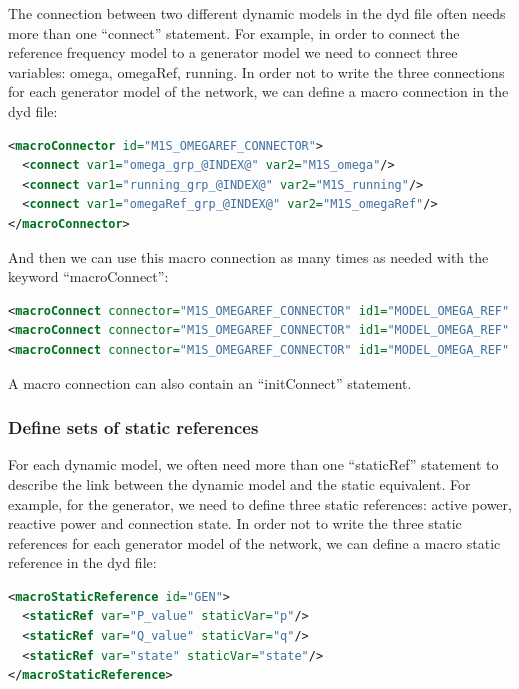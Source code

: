 \documentclass[a4paper, 12pt]{report}
\begin{document}
The connection between two different dynamic models in the dyd file often needs more than one ``connect'' statement. For example,  in order to connect the reference frequency model to a generator model we need to connect three variables: omega, omegaRef, running. In order not to write the three connections for each generator model of the network, we can define a macro connection in the dyd file:
\begin{lstlisting}[language=XML, morekeywords={macroConnector}]
<macroConnector id="M1S_OMEGAREF_CONNECTOR">
  <connect var1="omega_grp_@INDEX@" var2="M1S_omega"/>
  <connect var1="running_grp_@INDEX@" var2="M1S_running"/>
  <connect var1="omegaRef_grp_@INDEX@" var2="M1S_omegaRef"/>
</macroConnector>
\end{lstlisting}

And then we can use this macro connection as many times as needed with the keyword ``macroConnect'':
\begin{lstlisting}[language=XML, morekeywords={macroConnect}]
<macroConnect connector="M1S_OMEGAREF_CONNECTOR" id1="MODEL_OMEGA_REF" index1="0" id2="Generator0"/>
<macroConnect connector="M1S_OMEGAREF_CONNECTOR" id1="MODEL_OMEGA_REF" index1="1" id2="Generator1"/>
<macroConnect connector="M1S_OMEGAREF_CONNECTOR" id1="MODEL_OMEGA_REF" index1="2" id2="Generator2"/>
\end{lstlisting}

A macro connection can also contain an ``initConnect'' statement.

\subsubsection{Define sets of static references}

For each dynamic model, we often need more than one ``staticRef'' statement to describe the link between the dynamic model and the static equivalent. For example, for the generator, we need to define three static references: active power, reactive power and connection state. In order not to write the three static references for each generator model of the network, we can define a macro static reference in the dyd file:
\begin{lstlisting}[language=XML, morekeywords={macroStaticReference}]
<macroStaticReference id="GEN">
  <staticRef var="P_value" staticVar="p"/>
  <staticRef var="Q_value" staticVar="q"/>
  <staticRef var="state" staticVar="state"/>
</macroStaticReference>
\end{lstlisting}
\end{document}

